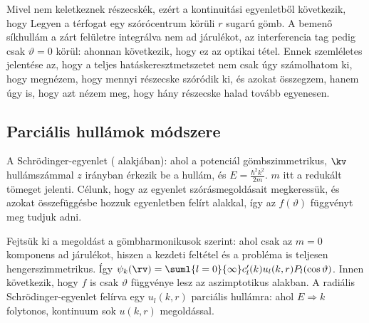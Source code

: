    Mivel nem keletkeznek részecskék, ezért a kontinuitási egyenletből következik, hogy
   Legyen a térfogat egy szórócentrum körüli $r$ sugarú gömb.
   A bemenő síkhullám a zárt felületre integrálva nem ad járulékot, az interferencia tag pedig csak $\vartheta=0$ körül:
   ahonnan következik, hogy 
   ez az optikai tétel.
   Ennek szemléletes jelentése az, hogy a teljes hatáskeresztmetszetet nem csak úgy számolhatom ki, hogy megnézem, hogy mennyi részecske szóródik ki, és azokat összegzem, hanem úgy is, hogy azt nézem meg, hogy hány részecske halad tovább egyenesen.
  
  \subsection{Parciális hullámok módszere}
   
   A Schrödinger-egyenlet ( alakjában):
   ahol a potenciál gömbszimmetrikus, $\kv$ hullámszámmal $z$ irányban érkezik be a hullám, és $E=\frac{\hbar^2 k^2}{2m}$. $m$ itt a redukált tömeget jelenti.
   Célunk, hogy az egyenlet szórásmegoldásait megkeressük, és azokat összefüggésbe hozzuk  egyenletben felírt alakkal, így az $f(\vartheta)$ függvényt meg tudjuk adni.
   
   Fejtsük ki a megoldást a gömbharmonikusok szerint: 
   ahol csak az $m=0$ komponens ad járulékot, hiszen a kezdeti feltétel és a probléma is teljesen hengerszimmetrikus. Így $\psi_k(\rv)=\suml{l=0}{\infty}c'_{l}(k)u_{l}(k,r)P_l(\cos\vartheta)$.
   Innen következik, hogy $f$ is csak $\vartheta$ függvénye lesz az aszimptotikus alakban.
   A radiális Schrödinger-egyenlet felírva egy $u_l(k,r)$ parciális hullámra:
   ahol $E\Rightarrow k$ folytonos, kontinuum sok $u(k,r)$ megoldással. 
   
